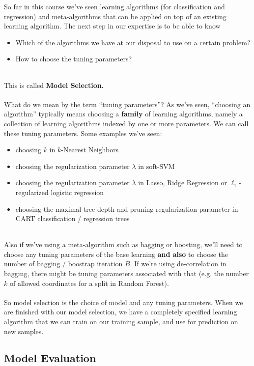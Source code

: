 So far in this course we've seen learning algorithms (for classification and
regression) and meta-algorithms that can be applied on top of an existing
learning algorithm. The next step in our expertise is to be able to know 
\begin{itemize}
  \item Which of the algorithms we have at our disposal to use on a certain
    problem?
  \item How to choose the tuning parameters?
\end{itemize}
~\\
This is called {\bf Model Selection.} 
\\~\\
What do we mean by the term ``tuning parameters''?
As we've seen, ``choosing an algorithm'' typically means choosing a {\bf family} of
learning algorithms, namely a collection of learning algorithms indexed by one
or more parameters. We can call these tuning parameters. 
Some examples we've seen:
\begin{itemize}
  \item choosing $k$ in $k$-Nearest Neighbors
  \item choosing the regularization parameter $\lambda$ in soft-SVM
  \item choosing the regularization parameter $\lambda$ in Lasso, Ridge Regression or
    $\ell_1$-regularized logistic regression
  \item choosing the maximal tree depth and pruning regularization parameter in
    CART classification / regression trees
\end{itemize}
~\\
Also if we've using a meta-algorithm such as bagging or boosting, we'll need to
choose any tuning parameters of the base learning {\bf and also} to choose the number
of bagging / boostrap iteration $B$. If we're using de-correlation in bagging,
there might be tuning parameters associated with that (e.g. the number $k$ of
allowed coordinates for a split in Random Forest).
\\~\\
So model selection is the choice of model and any tuning parameters. When 
we are
finished with our model selection, we have a completely specified learning algorithm
that we can train on our training sample, and use for prediction on new samples.

\subsection{Model Evaluation}

